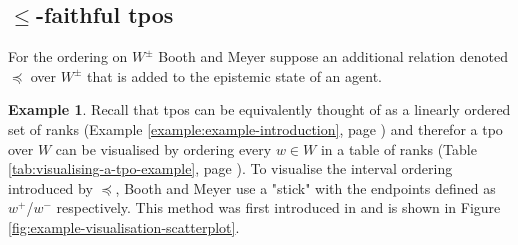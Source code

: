 \documentclass[english, 12pt]{scrartcl}
\theoremstyle{definition}
\newtheorem{example}{Example}[section]
\theoremstyle{definition}
\theoremstyle{definition}
\begin{document}
\subsection{$\leq$-faithful tpos}
For the ordering on $W^{\pm}$ Booth and Meyer suppose an additional relation denoted $\preceq$ over $W^{\pm}$ that is added to the epistemic state of an agent.

\begin{example}
    \label{example:example-stick}
    Recall that tpos can be equivalently thought of as a linearly ordered set of ranks (Example \ref{example:example-introduction}, page \pageref{example:example-introduction}) and therefor a tpo over $W$ can be visualised by ordering every $w \in W$ in a table of ranks (Table \ref{tab:visualising-a-tpo-example}, page \pageref{tab:visualising-a-tpo-example}). To visualise the interval ordering introduced by $\preceq$, Booth and Meyer use a "stick" with the endpoints defined as $w^{+}$/$w^{-}$ respectively. This method was first introduced in \cite{Booth2007} and is shown in Figure \ref{fig:example-visualisation-scatterplot}.
        
    \begin{figure}[h]
        \centering
\end{figure}
\end{example}
\end{document}
